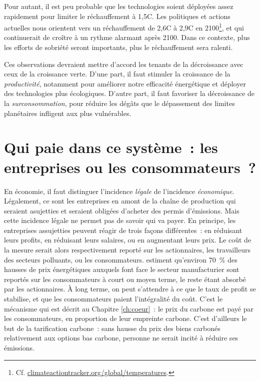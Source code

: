 \documentclass[a5paper,french]{memoir}
\begin{document}
Pour autant, il est peu probable que les technologies soient déployées assez rapidement pour limiter le réchauffement à 1,5\textdegree{}C. Les politiques et actions actuelles nous orientent vers un réchauffement de 2,6\textdegree{}C à 2,9\textdegree{}C en 2100\footnote{Cf. \href{https://climateactiontracker.org/global/temperatures/}{climateactiontracker.org/global/temperatures}.}, et qui continuerait de croître à un rythme alarmant après 2100. Dans ce contexte, plus les efforts de sobriété seront importants, plus le réchauffement sera ralenti. 

Ces observations devraient mettre d'accord les tenants de la décroissance avec ceux de la croissance verte. D'une part, il faut stimuler la croissance de la \textit{productivité}, notamment pour améliorer notre efficacité énergétique et déployer des technologies plus écologiques. D'autre part, il faut favoriser la décroissance de la \textit{surconsommation}, pour réduire les dégâts que le dépassement des limites planétaires infligent aux plus vulnérables. 

\section*{\normalsize Qui paie dans ce système~: les entreprises ou les consommateurs~?}\label{q:incidence}

En économie, il faut distinguer l'incidence \textit{légale} de l'incidence \textit{économique}. Légalement, ce sont les entreprises en amont de la chaîne de production qui seraient asujetties et seraient obligées d'acheter des permis d'émissions. Mais cette incidence légale ne permet pas de savoir qui va payer. En principe, les entreprises assujetties peuvent réagir de trois façons différentes~: en réduisant leurs profits, en réduisant leurs salaires, ou en augmentant leurs prix. Le coût de la mesure serait alors respectivement reporté sur les actionnaires, les travailleurs des secteurs polluants, ou les consommateurs. \cite{ganapati_energy_2020} estiment qu'environ 70~\% des hausses de prix énergétiques auxquels font face le secteur manufacturier sont reportés sur les consommateurs à court ou moyen terme, le reste étant absorbé par les actionnaires. À long terme, on peut s'attendre à ce que le taux de profit se stabilise, et que les consommateurs paient l'intégralité du coût. C'est le mécanisme qui est décrit au Chapitre \ref{ch:coeur}~: le prix du carbone est payé par les consommateurs, en proportion de leur empreinte carbone. C'est d'ailleurs le but de la tarification carbone~: sans hausse du prix des biens carbonés relativement aux options bas carbone, personne ne serait incité à réduire ses émissions.
\end{document}
